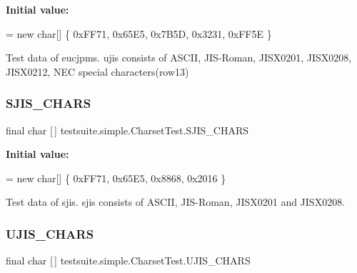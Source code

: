 {\bfseries Initial value\+:}
\begin{DoxyCode}
= \textcolor{keyword}{new} \textcolor{keywordtype}{char}[] \{ 0xFF71, 
            0x65E5, 
            0x7B5D, 
            0x3231, 
            0xFF5E 
    \}
\end{DoxyCode}
Test data of eucjpms. ujis consists of A\+S\+C\+II, J\+I\+S-\/\+Roman, J\+I\+S\+X0201, J\+I\+S\+X0208, J\+I\+S\+X0212, N\+EC special characters(row13) \mbox{\label{classtestsuite_1_1simple_1_1_charset_test_aea9e321b4ce55b3fe366d39ac69da267}} 
\subsubsection{\texorpdfstring{S\+J\+I\+S\+\_\+\+C\+H\+A\+RS}{SJIS\_CHARS}}
{\footnotesize\ttfamily final char \mbox{[}$\,$\mbox{]} testsuite.\+simple.\+Charset\+Test.\+S\+J\+I\+S\+\_\+\+C\+H\+A\+RS\hspace{0.3cm}{\ttfamily [static]}}

{\bfseries Initial value\+:}
\begin{DoxyCode}
= \textcolor{keyword}{new} \textcolor{keywordtype}{char}[] \{ 0xFF71, 
            0x65E5, 
            0x8868, 
            0x2016 
    \}
\end{DoxyCode}
Test data of sjis. sjis consists of A\+S\+C\+II, J\+I\+S-\/\+Roman, J\+I\+S\+X0201 and J\+I\+S\+X0208. \mbox{\label{classtestsuite_1_1simple_1_1_charset_test_afdb55a8c00071fb31c3b37c660d8ba3c}} 
\subsubsection{\texorpdfstring{U\+J\+I\+S\+\_\+\+C\+H\+A\+RS}{UJIS\_CHARS}}
{\footnotesize\ttfamily final char \mbox{[}$\,$\mbox{]} testsuite.\+simple.\+Charset\+Test.\+U\+J\+I\+S\+\_\+\+C\+H\+A\+RS\hspace{0.3cm}{\ttfamily [static]}}

